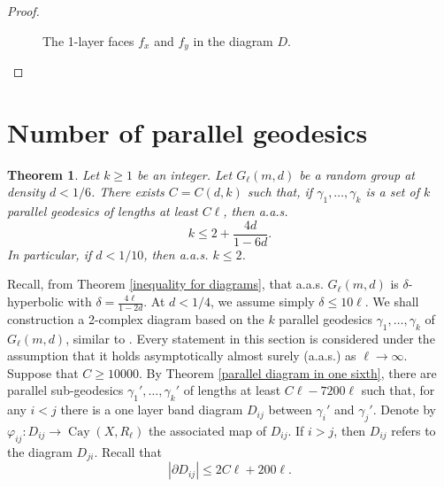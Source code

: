\documentclass[a4paper]{article}
\DeclareMathOperator{\Cay}{Cay}
\newtheorem{thm}{Theorem}[section]
\theoremstyle{remark}
\begin{document}
\begin{proof}
\begin{figure}[h]
\begin{center}
\end{center}
    \caption{The 1-layer faces $f_x$ and $f_y$ in the diagram $D$.}
\end{figure}

\end{proof}

\section{Number of parallel geodesics}

\begin{thm}\label{number of parallel geodesics} Let $k\geq 1$ be an integer. Let $G_\ell(m,d)$ be a random group at density $d<1/6$. There exists $C=C(d,k  )$ such that, if $\gamma_1,\dots,\gamma_k$ is a set of $k$ parallel geodesics of lengths at least $C\ell$, then a.a.s.
\[k\leq 2+\frac{4d}{1-6d}.\]
In particular, if $d<1/10$, then a.a.s. $k\leq 2$.
\end{thm}

Recall, from Theorem \ref{inequality for diagrams}, that a.a.s. $G_\ell(m,d)$ is $\delta$-hyperbolic with $\delta = \frac{4\ell}{1-2d}$. At $d<1/4$, we assume simply $\delta\leq 10\ell$. We shall construction a 2-complex diagram based on the $k$ parallel geodesics $\gamma_1,\dots,\gamma_k$ of $G_\ell(m,d)$, similar to \cite{GM18}. Every statement in this section is considered under the assumption that it holds asymptotically almost surely (a.a.s.) as $\ell\to\infty$.\\

Suppose that $C\geq 10000$. By Theorem \ref{parallel diagram in one sixth}, there are parallel sub-geodesics $\gamma_1',\dots,\gamma_k'$ of lengths at least $C\ell-7200\ell$ such that, for any $i<j$ there is a one layer band diagram $D_{ij}$ between $\gamma_i'$ and $\gamma_j'$. Denote by $\varphi_{ij}: D_{ij}\to \Cay(X,R_\ell)$ the associated map of $D_{ij}$. If $i>j$, then $D_{ij}$ refers to the diagram $D_{ji}$. Recall that
\[|\partial D_{ij}| \leq 2C\ell+200\ell.\]
\end{document}
